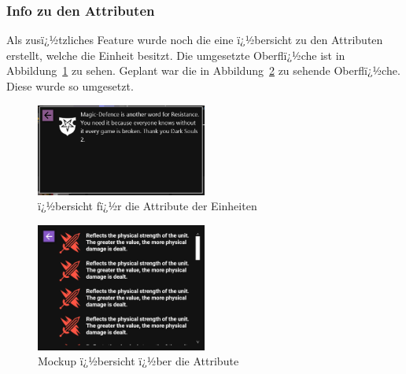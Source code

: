 \documentclass[12pt, titlepage]{scrartcl}
\newcommand{\Abb}[1]{%
	Abbildung\ \ref{#1}%
}
\begin{document}
			\subsubsection{Info zu den Attributen}
			Als zusï¿½tzliches Feature wurde noch die eine ï¿½bersicht zu den Attributen erstellt, welche die Einheit besitzt. Die umgesetzte Oberflï¿½che ist in \Abb{AttributInfo} zu sehen. Geplant war die in \Abb{MockupAttribute} zu sehende Oberflï¿½che. Diese wurde so umgesetzt.
			
			\begin{figure}[H] 
				\centering
				\includegraphics[width=0.5\textwidth]{Attribute_Info_final.PNG}
				\caption{ï¿½bersicht fï¿½r die Attribute der Einheiten}
				\label{AttributInfo}
			\end{figure}
		
			\begin{figure}[H] 
				\centering
				\includegraphics[width=0.5\textwidth]{InfoView.png}
				\caption{Mockup ï¿½bersicht ï¿½ber die Attribute}
				\label{MockupAttribute}
			\end{figure}
		
\end{document}
